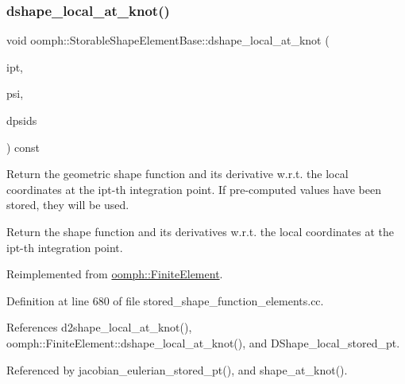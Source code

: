 \subsubsection{\texorpdfstring{dshape\+\_\+local\+\_\+at\+\_\+knot()}{dshape\_local\_at\_knot()}}
{\footnotesize\ttfamily void oomph\+::\+Storable\+Shape\+Element\+Base\+::dshape\+\_\+local\+\_\+at\+\_\+knot (\begin{DoxyParamCaption}\item[{const unsigned \&}]{ipt,  }\item[{\hyperlink{classoomph_1_1Shape}{Shape} \&}]{psi,  }\item[{\hyperlink{classoomph_1_1DShape}{D\+Shape} \&}]{dpsids }\end{DoxyParamCaption}) const\hspace{0.3cm}{\ttfamily [virtual]}}



Return the geometric shape function and its derivative w.\+r.\+t. the local coordinates at the ipt-\/th integration point. If pre-\/computed values have been stored, they will be used. 

Return the shape function and its derivatives w.\+r.\+t. the local coordinates at the ipt-\/th integration point. 

Reimplemented from \hyperlink{classoomph_1_1FiniteElement_a2214ae814100dcbb553ac97cf243dcfe}{oomph\+::\+Finite\+Element}.



Definition at line 680 of file stored\+\_\+shape\+\_\+function\+\_\+elements.\+cc.



References d2shape\+\_\+local\+\_\+at\+\_\+knot(), oomph\+::\+Finite\+Element\+::dshape\+\_\+local\+\_\+at\+\_\+knot(), and D\+Shape\+\_\+local\+\_\+stored\+\_\+pt.



Referenced by jacobian\+\_\+eulerian\+\_\+stored\+\_\+pt(), and shape\+\_\+at\+\_\+knot().

\mbox{\label{classoomph_1_1StorableShapeElementBase_a90f64349a5a609ddc42cf6bd15754282}} 
